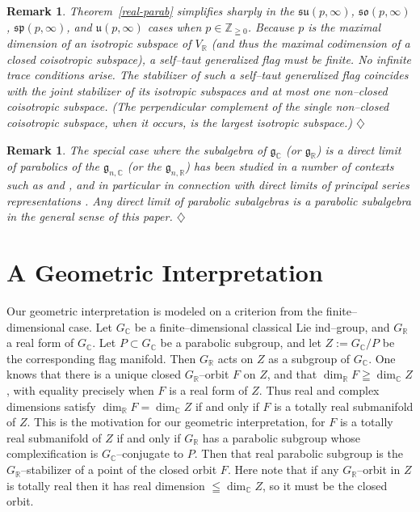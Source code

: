 \documentclass[oneside,leqno,11pt]{article}
\def\gg{\mathfrak{g}}
\def\gso{\mathfrak{so}}
\def\gsu{\mathfrak{su}}
\def\gsp{\mathfrak{sp}}
\def\gu{\mathfrak{u}}
\def\C{\mathbb{C}}
\def\R{\mathbb{R}}
\def\Z{\mathbb{Z}}
\newtheorem{remark}[equation]{Remark}
\begin{document}
\begin{remark}\label{finite-unitary}{\rm
Theorem~\ref{real-parab} simplifies sharply in the $\gsu(p,\infty)$, $\gso(p,\infty)$, $\gsp(p,\infty)$, and $\gu(p,\infty)$ cases when $p \in \Z_{\geqq 0}$.
Because $p$ is the maximal dimension of an isotropic
subspace of $V_\R$ (and thus the maximal codimension of a closed coisotropic subspace), a self--taut generalized flag must be finite.  No infinite trace conditions arise.
The stabilizer of such a self--taut generalized flag coincides with the joint stabilizer of its
isotropic subspaces and at most one non--closed coisotropic subspace.  (The perpendicular complement of the single non--closed coisotropic subspace, when it occurs, is the largest isotropic subspace.)
}
\hfill $\diamondsuit$
\end{remark}

\begin{remark}\label{sec3rem}{\rm
The special case where the subalgebra of $\gg_\C$ (or $\gg_\R$) is 
a direct limit of parabolics of the $\gg_{n,\C}$ (or the $\gg_{n,\R}$)
has been studied in a number of contexts such as \cite{DPW} and \cite{NRW}, 
and in particular in connection with  direct limits of principal 
series representations \cite{W5}.  Any direct limit of
parabolic subalgebras is a parabolic subalgebra in the general sense of this paper.
}
\hfill $\diamondsuit$
\end{remark} 

\section{A Geometric Interpretation} \label{sec5}
\setcounter{equation}{0}

Our geometric interpretation is modeled on a criterion from the  finite--dimensional case.  
Let $G_\C$ be a finite--dimensional classical Lie ind--group, and $G_\R$ a real form of $G_\C$.
Let $P \subset G_\C$ be a parabolic subgroup, and
let $Z := G_\C/P$ be the corresponding flag manifold. 
Then $G_\R$ acts on $Z$ as a subgroup of $G_\C$.  One knows \cite[Theorem 3.6]{W2}
that there is a unique closed $G_\R$--orbit 
$F$ on $Z$, and that 
$\dim_\R F \geqq \dim_\C Z$,
with equality precisely when $F$ is a real form of $Z$.  Thus
real and complex dimensions satisfy $\dim_\R F = \dim_\C Z$
if and only if $F$ is a totally real submanifold of $Z$.
This is the motivation for our geometric interpretation, for 
$F$ is a totally real submanifold of $Z$ if and only if $G_\R$
has a parabolic subgroup whose complexification is 
$G_\C$--conjugate to $P$.  Then that real parabolic subgroup is
the $G_\R$--stabilizer of a point of the closed orbit $F$.
Here note that if any $G_\R$--orbit in $Z$ is totally real then
it has real dimension $\leqq \dim_\C Z$, so it must be the closed orbit.
\end{document}
